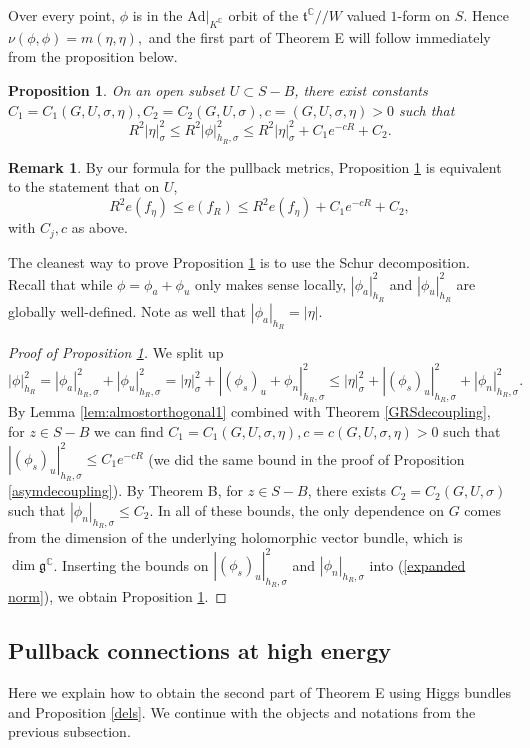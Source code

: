 \documentclass[10pt]{amsart}
\newcommand{\g}{\mathfrak{g}}
\newcommand{\ft}{\mathfrak{t}}
\newtheorem{prop}[thm]{Proposition}
\theoremstyle{definition}
\newtheorem{remark}[thm]{Remark}
\DeclareMathOperator{\C}{\mathbb{C}}
\begin{document}
Over every point, $\phi$ is in the $\textrm{Ad}|_{K^{\C}}$ orbit of the $\ft^{\C}//W$ valued $1$-form on $S$. Hence $\nu(\phi,\phi)=m(\eta,\eta),$ and the first part of Theorem E will follow immediately from the proposition below. 
\begin{prop}\label{normcomparison}
    On an open subset $U\subset S-B$, there exist constants $C_1=C_1(G,U,\sigma, \eta), C_2=C_2(G,U,\sigma), c=(G,U,\sigma, \eta)>0$ such that
    $$R^2|\eta|_{\sigma}^2\leq R^2|\phi|_{h_R,\sigma}^2 \leq R^2|\eta|_{\sigma}^2 + C_1e^{-cR}+C_2.$$ 
\end{prop}
\begin{remark}
    By our formula for the pullback metrics, Proposition \ref{normcomparison} is equivalent to the statement that on $U$, $$R^2 e(f_\eta)\leq e(f_R)\leq R^2e(f_\eta) + C_1e^{-cR}+C_2,$$ with $C_j,c$ as above.
\end{remark}
The cleanest way to prove Proposition \ref{normcomparison} is to use the Schur decomposition. Recall that while $\phi=\phi_a+\phi_u$ only makes sense locally, $|\phi_a|_{h_R}^2$ and $|\phi_u|_{h_R}^2$ are globally well-defined. Note as well that $|\phi_a|_{h_R}=|\eta|$. 
\begin{proof}[Proof of Proposition \ref{normcomparison}]
We split up 
\begin{equation}\label{expanded norm}
|\phi|_{h_R}^2 =|\phi_{a}|_{h_R,\sigma}^2+|\phi_u|_{h_R,\sigma}^2 = |\eta|_{\sigma}^2+|(\phi_s)_u + \phi_n|_{h_R,\sigma}^2\leq |\eta|_\sigma^2+|(\phi_s)_u|_{h_R,\sigma}^2 + |\phi_n|_{h_R,\sigma}^2.
\end{equation}
By Lemma \ref{lem:almostorthogonal1} combined with Theorem \ref{GRSdecoupling}, for $z\in S-B$ we can find $C_1=C_1(G,U,\sigma,\eta),c=c(G,U,\sigma,\eta)>0$ such that $|(\phi_s)_u|_{h_R,\sigma}^2\leq C_1e^{-cR}$ (we did the same bound in the proof of Proposition \ref{asymdecoupling}). By Theorem B, for $z\in S-B$, there exists $C_2=C_2(G,U,\sigma)$ such that $|\phi_n|_{h_R,\sigma}\leq C_2.$ In all of these bounds, the only dependence on $G$ comes from the dimension of the underlying holomorphic vector bundle, which is $\dim \g^{\C}$. Inserting the bounds on $|(\phi_s)_u|_{h_R,\sigma}^2$ and $|\phi_n|_{h_R,\sigma}$ into (\ref{expanded norm}), we obtain Proposition \ref{normcomparison}.
\end{proof}

\subsection{Pullback connections at high energy}
Here we explain how to obtain the second part of Theorem E using Higgs bundles and Proposition \ref{dels}. We continue with the objects and notations from the previous subsection. 
\end{document}
